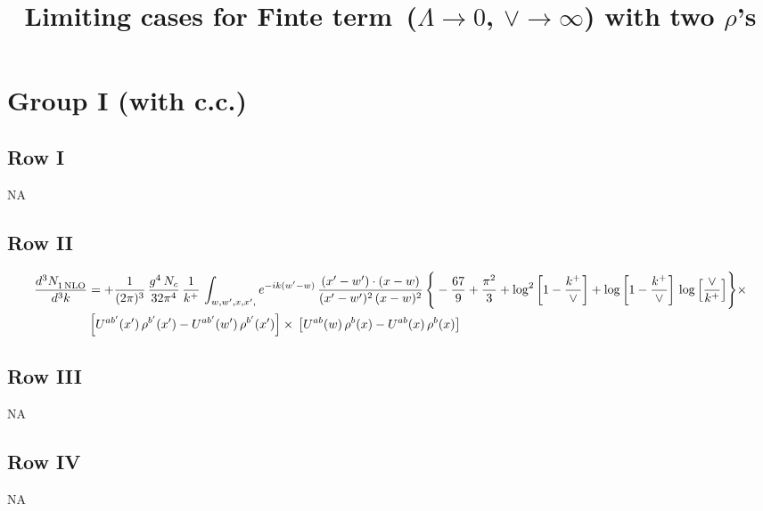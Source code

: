 \documentclass[9pt]{article}
\title{Limiting cases for Finte term\, ($\Lambda\to 0$, $\vee\to \infty$) with two $\rho$'s}
\author{}
\date{}
\numberwithin{equation}{section}
\begin{document}
\maketitle
\section{Group I (with c.c.)}
\subsection{Row I}
\textsc{NA}
\subsection{Row II}
\begin{align}
     \frac{d^{3}N_{1\,\rm NLO}^{\rm}}{d^{3}k} &  =  +\frac{1}{(2\pi)^{3}}\, \frac{g^{4}\,N_{c}}{32\pi^{4}}\,\frac{1}{k^{+}}\, \int_{w, w',x,x',} e^{-ik(w^\prime-w)}\, \frac{(x'-w')\cdot (x-w)}{(x'-w')^{2}\, (x-w)^{2}}\, \Bigg\{ -\frac{67}{9}+\frac{\pi^{2}}{3}+\log^{2}{\left[1-\frac{k^{+}}{\vee}\right]}+\log{\left[1-\frac{k^{+}}{\vee}\right]}\,\log{\left[\frac{\vee}{k^{+}}\right]}\Bigg\}\times\notag \\ & \left[U^{ab'}(x')\,\rho^{b'}(x') - U^{ab'}(w')\,\rho^{b'}(x')\right]\times\,\left[U^{ab}(w)\,\rho^{b}(x) - U^{ab}(x)\,\rho^{b}(x)\right]
\end{align}  
\subsection{Row III}
\textsc{NA}
\subsection{Row IV}
\textsc{NA}
\end{document}
